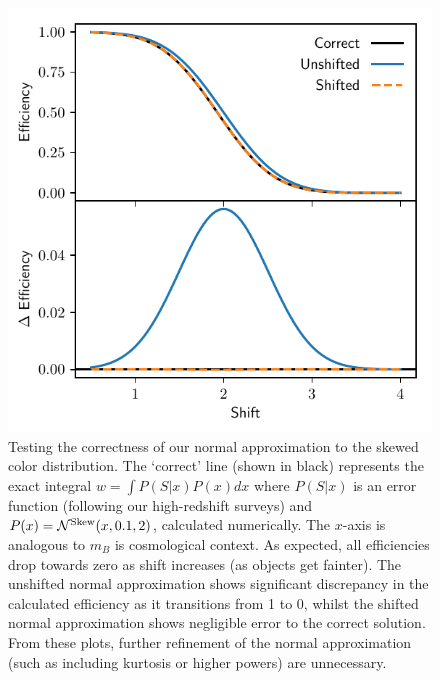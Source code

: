 \documentclass[a4paper,fleqn,usenatbib,manuscript]{emulateapj}
\begin{document}
\begin{figure}
	\begin{center}
		\includegraphics[width=\columnwidth]{shift.pdf}
	\end{center}
	\caption{Testing the correctness of our normal approximation to the skewed color distribution. The `correct' line (shown in black) represents the exact integral $w = \int P(S|x) P(x) dx$ where $P(S|x)$ is an error function (following our high-redshift surveys) and $P(x) = \mathcal{N}^{\rm Skew}(x, 0.1, 2)$, calculated numerically. The $x$-axis is analogous to $m_B$ is cosmological context. As expected, all efficiencies drop towards zero as shift increases (as objects get fainter). The unshifted normal approximation shows significant discrepancy in the calculated efficiency as it transitions from 1 to 0, whilst the shifted normal approximation shows negligible error to the correct solution. From these plots, further refinement of the normal approximation (such as including kurtosis or higher powers) are unnecessary.}
	\label{fig:shift}
\end{figure}
\end{document}
